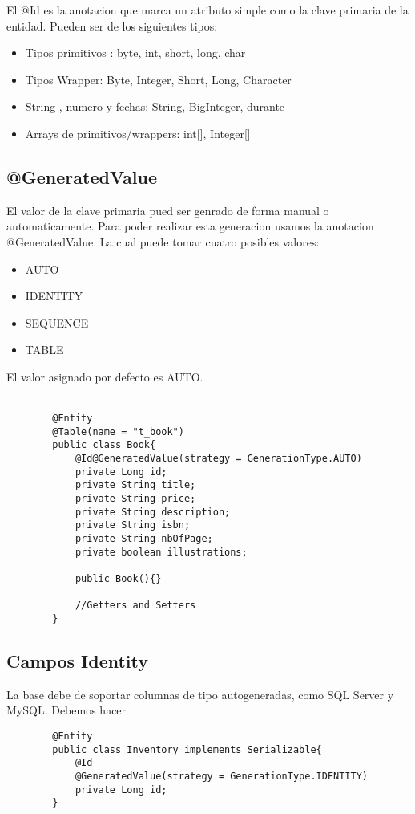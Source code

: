 \documentclass{article}
\begin{document}
El @Id es la anotacion que marca un atributo simple como la clave primaria de la entidad. Pueden ser de los siguientes tipos:
\begin{itemize}
	\item Tipos primitivos : byte, int, short, long, char
	\item Tipos Wrapper: Byte, Integer, Short, Long, Character
	\item String , numero y fechas: String, BigInteger, durante
	\item Arrays de primitivos/wrappers: int[], Integer[]
\end{itemize}

\subsection*{@GeneratedValue}
El valor de la clave primaria pued ser genrado de forma manual o automaticamente. Para poder realizar esta generacion usamos la anotacion @GeneratedValue.
La cual puede tomar cuatro posibles valores:
\begin{itemize}
	\item AUTO
	\item IDENTITY
	\item SEQUENCE
	\item TABLE
\end{itemize}
El valor asignado por defecto es AUTO. \\\\

\begin{lstlisting}
        @Entity
        @Table(name = "t_book")
        public class Book{
            @Id@GeneratedValue(strategy = GenerationType.AUTO)
            private Long id; 
            private String title;
            private String price; 
            private String description;
            private String isbn;
            private String nbOfPage;
            private boolean illustrations;

            public Book(){}

            //Getters and Setters
        }
    \end{lstlisting}
\subsection*{Campos Identity}
La base debe de soportar columnas de tipo autogeneradas, como SQL Server y MySQL. Debemos hacer
\begin{lstlisting}
        @Entity
        public class Inventory implements Serializable{
            @Id
            @GeneratedValue(strategy = GenerationType.IDENTITY)
            private Long id;
        }
    \end{lstlisting}
\end{document}
